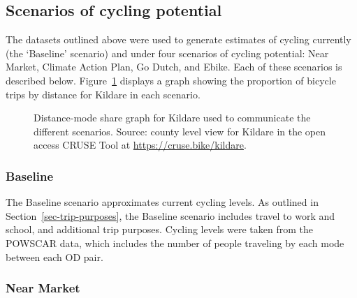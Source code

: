 \documentclass[
  super,
  preprint,
  3p]{elsarticle}
\begin{document}
\subsection{Scenarios of cycling potential}\label{sec-scenarios}

The datasets outlined above were used to generate estimates of cycling
currently (the `Baseline' scenario) and under four scenarios of cycling
potential: Near Market, Climate Action Plan, Go Dutch, and Ebike. Each
of these scenarios is described below. Figure~\ref{fig-scenarios}
displays a graph showing the proportion of bicycle trips by distance for
Kildare in each scenario.

\begin{figure}


\caption{\label{fig-scenarios}Distance-mode share graph for Kildare used
to communicate the different scenarios. Source: county level view for
Kildare in the open access CRUSE Tool at
\url{https://cruse.bike/kildare}.}

\end{figure}%

\subsubsection{Baseline}\label{baseline}

The Baseline scenario approximates current cycling levels. As outlined
in Section~\ref{sec-trip-purposes}, the Baseline scenario includes
travel to work and school, and additional trip purposes. Cycling levels
were taken from the POWSCAR data, which includes the number of people
traveling by each mode between each OD pair.

\subsubsection{Near Market}\label{near-market}
\end{document}
